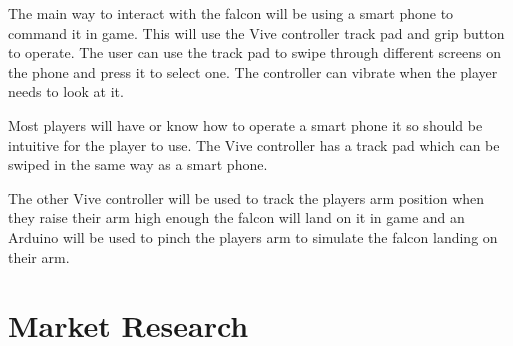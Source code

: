 \documentclass{scrartcl}
\begin{document}
The main way to interact with the falcon will be using a smart phone to command it in game. This will use the Vive controller track pad and grip button to operate. The user can use the track pad to swipe through different screens on the phone and press it to select one. The controller can vibrate when the player needs to look at it.

Most players will have or know how to operate a smart phone it so should be intuitive for the player to use. The Vive controller has a track pad which can be swiped in the same way as a smart phone.

The other Vive controller will be used to track the players arm position when they raise their arm high enough the falcon will land on it in game and an Arduino will be used to pinch the players arm to simulate the falcon landing on their arm.



\section{Market Research}


%
	
\end{document}
